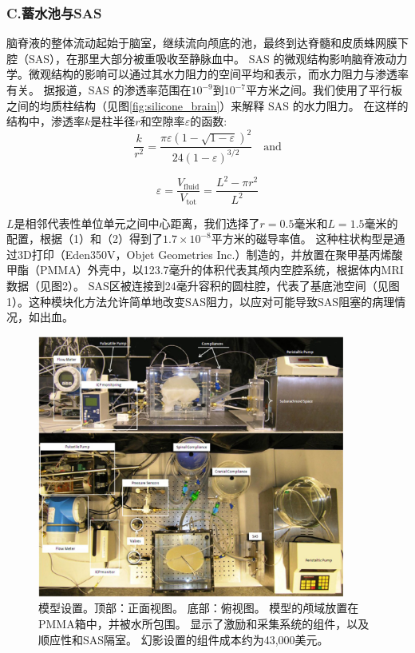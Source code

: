 \documentclass[12pt]{article}
\begin{document}
\subsubsection*{C.蓄水池与SAS}
脑脊液的整体流动起始于脑室，继续流向颅底的池，最终到达脊髓和皮质蛛网膜下腔（SAS），在那里大部分被重吸收至静脉血中。
SAS 的微观结构影响脑脊液动力学。微观结构的影响可以通过其水力阻力的空间平均和表示，而水力阻力与渗透率有关。
据报道，SAS 的渗透率范围在$10^{-9}$到$10^{-7}$平方米之间。我们使用了平行板之间的均质柱结构（见图\ref{fig:silicone_brain}）来解释 SAS 的水力阻力。
在这样的结构中，渗透率$k$是柱半径$r$和空隙率$\varepsilon$的函数:
\begin{equation}
    \frac{k}{r^2} = \frac{\pi \varepsilon \left(1 - \sqrt{1 - \varepsilon}\right)^2}{24 \left(1 - \varepsilon\right)^{3/2}} \quad \text{and}
\end{equation}

\begin{equation}
    \varepsilon = \frac{V_{\text{fluid}}}{V_{\text{tot}}} = \frac{L^2 - \pi r^2}{L^2}
\end{equation}

$L$是相邻代表性单位单元之间中心距离，我们选择了$r = 0.5$毫米和$L = 1.5$毫米的配置，根据（1）和（2）得到了$1.7×10^{−8}$平方米的磁导率值。
这种柱状构型是通过3D打印（Eden350V，Objet Geometries Inc.）制造的，并放置在聚甲基丙烯酸甲酯（PMMA）外壳中，以123.7毫升的体积代表其颅内空腔系统，根据体内MRI数据（见图2）。
SAS区被连接到24毫升容积的圆柱腔，代表了基底池空间（见图1）。这种模块化方法允许简单地改变SAS阻力，以应对可能导致SAS阻塞的病理情况，如出血。

\begin{figure}[h]
    \centering
    \includegraphics[width=0.9\textwidth]{Figures/4.png}
    \caption{模型设置。顶部：正面视图。 底部：俯视图。 模型的颅域放置在PMMA箱中，并被水所包围。 显示了激励和采集系统的组件，以及顺应性和SAS隔室。 幻影设置的组件成本约为43,000美元。}
    \label{fig:csf_flow_path}
\end{figure}
\end{document}
